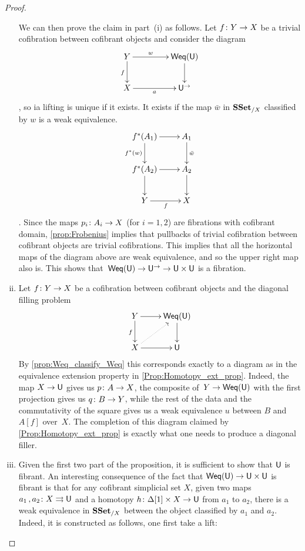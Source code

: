 \documentclass[reqno,10pt,a4paper,oneside,draft]{amsart}
\begin{document}
\begin{proof}
\begin{enumerate}[(i)]
We can then prove the claim in part~(i) as follows. 
Let $f \colon Y \to X$ be a trivial cofibration between cofibrant objects and consider the diagram
\[ 
\xymatrix@C=1.5cm{ Y \ar[d]_f \ar[r]^-{w} & \mathsf{Weq}(\U) \ar[d] \\
X \ar[r]_-{a} & \U^{\rightarrow} }
\]
, so ia lifting is unique if it exists. It exists if the map $\bar{w}$ in $\mathbf{SSet}_{/X}$ classified by $w$ is a weak equivalence. 
\[ 
\xymatrix{ 
f^*(A_1) \ar[d]_{f^*(w)}  \ar[r]  & A_1 \ar[d]^{\bar{w}} \\
f^*(A_2) \ar[r] \ar[d]   & A_2 \ar[d] \\
Y \ar[r]_f & X }
\]
.
Since the maps $p_i \colon A_i \rightarrow X$ (for $i = 1, 2$) are fibrations with cofibrant domain, \cref{prop:Frobenius} implies that pullbacks of trivial cofibration between cofibrant objects 
 are trivial cofibrations. This implies that all the horizontal maps of the diagram above are weak equivalence, and so the upper right map also is. This shows that~$\mathsf{Weq}(\mathsf{U}) \rightarrow \mathsf{U}^{\rightarrow} \rightarrow \mathsf{U} \times \mathsf{U}$ is a fibration.
\item Let $f \colon Y \rightarrow X$ be a cofibration between cofibrant objects and the diagonal
filling problem
\[
\xymatrix{Y \ar[d]_f \ar[r] & \mathsf{Weq}(\U) \ar[d] \\
X \ar[r] \ar@{.>}[ur]  & \U 
}
\]
By  \cref{prop:Weq_classify_Weq} this corresponds exactly to a diagram as in the equivalence extension property in \cref{Prop:Homotopy_ext_prop}. Indeed, the map $X \rightarrow \mathsf{U}$ gives us
$p \colon A \to X$, the composite of~$Y \rightarrow  \mathsf{Weq}(\mathsf{U})$ with the first projection
gives us $q \colon B \to Y$, while the rest of the data and the commutativity of the square 
gives us a weak equivalence $u$ between $B$ and $A[f]$ over~$X$. The completion of this diagram claimed by \cref{Prop:Homotopy_ext_prop} is exactly what one needs to produce a diagonal filler.
\item Given the first two part of the proposition, it is sufficient to show that $\mathsf{U}$ is fibrant. An interesting consequence of the fact that $\mathsf{Weq}(\mathsf{U}) \rightarrow \mathsf{U} \times \mathsf{U}$ is fibrant is that for any cofibrant 
simplicial set $X$, given two maps $a_1 \, , a_2 \colon X \rightrightarrows \mathsf{U}$ and a homotopy $h \colon \Delta[1] \times X \rightarrow \mathsf{U}$ from $a_1$ to $a_2$, there is a weak equivalence in $\mathbf{SSet}_{/X}$ between the object classified by $a_1$ and $a_2$. Indeed, it is constructed as follows, one first take a lift:

\end{enumerate}
\end{proof}
\end{document}
